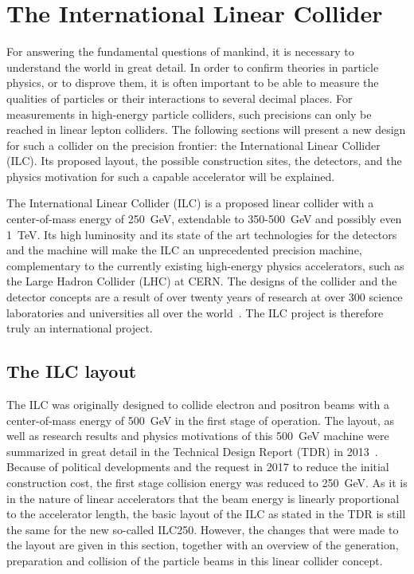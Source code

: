 \chapter{The International Linear Collider}
\label{ILC}
\begin{chapterabstract}
For answering the fundamental questions of mankind, it is necessary to understand the world in great detail.
In order to confirm theories in particle physics, or to disprove them, it is often important to be able to measure the qualities of particles or their interactions to several decimal places.
For measurements in high-energy particle colliders, such precisions can only be reached in linear lepton colliders.
The following sections will present a new design for such a collider on the precision frontier: the International Linear Collider (ILC). 
Its proposed layout, the possible construction sites, the detectors, and the physics motivation for such a capable accelerator will be explained.
\end{chapterabstract}
\newline

The International Linear Collider (ILC) is a proposed linear \positron\electron collider with a center-of-mass energy of \SI{250}{\GeV}, extendable to 350-\SI{500}{\GeV} and possibly even \SI{1}{\TeV}.
Its high luminosity and its state of the art technologies for the detectors and the machine will make the ILC an unprecedented precision machine, complementary to the currently existing high-energy physics accelerators, such as the Large Hadron Collider (LHC) at CERN.
The designs of the collider and the detector concepts are a result of over twenty years of research at over 300 science laboratories and universities all over the world~\cite{TDR1}.
The ILC project is therefore truly an international project.

\section{The ILC layout}
\label{ILC:layout}
The ILC was originally designed to collide electron and positron beams with a center-of-mass energy of \SI{500}{\GeV} in the first stage of operation.
The layout, as well as research results and physics motivations of this \SI{500}{\GeV} machine were summarized in great detail in the Technical Design Report (TDR) in 2013~\cite{TDR}.
Because of political developments and the request in 2017 to reduce the initial construction cost, the first stage collision energy was reduced to \SI{250}{\GeV}.
As it is in the nature of linear accelerators that the beam energy is linearly proportional to the accelerator length, the basic layout of the ILC as stated in the TDR is still the same for the new so-called ILC250.
However, the changes that were made to the layout are given in this section, together with an overview of the generation, preparation and collision of the particle beams in this linear collider concept.

